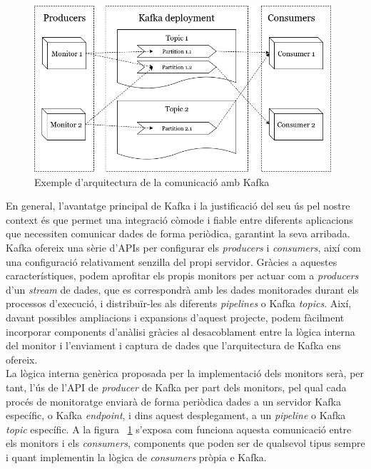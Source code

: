 \begin{figure}
\centering
\includegraphics[width=11cm]{Figures/Figure7}
\decoRule
\caption[Exemple d'arquitectura de la comunicació amb Kafka]{Exemple d'arquitectura de la comunicació amb Kafka}
\label{fig:Kafka}
\end{figure}

En general, l'avantatge principal de Kafka i la justificació del seu ús pel nostre context és que permet una integració còmode i fiable entre diferents aplicacions que necessiten comunicar dades de forma periòdica, garantint la seva arribada. Kafka ofereix una sèrie d'APIs per configurar els \textit{producers} i \textit{consumers}, així com una configuració relativament senzilla del propi servidor. Gràcies a aquestes característiques, podem aprofitar els propis monitors per actuar com a \textit{producers} d'un \textit{stream} de dades, que es correspondrà amb les dades monitorades durant els processos d'execució, i distribuïr-les als diferents \textit{pipelines} o Kafka \textit{topics}. Així, davant possibles ampliacions i expansions d'aquest projecte, podem fàcilment incorporar components d'anàlisi gràcies al desacoblament entre la lògica interna del monitor i l'enviament i captura de dades que l'arquitectura de Kafka ens ofereix.\\

La lògica interna genèrica proposada per la implementació dels monitors serà, per tant, l'ús de l'API de \textit{producer} de Kafka per part dels monitors, pel qual cada procés de monitoratge enviarà de forma periòdica dades a un servidor Kafka específic, o Kafka \textit{endpoint}, i dins aquest desplegament, a un \textit{pipeline} o Kafka \textit{topic} específic. A la figura ~\ref{fig:Kafka} s'exposa com funciona aquesta comunicació entre els monitors i els \textit{consumers}, components que poden ser de qualsevol tipus sempre i quant implementin la lògica de \textit{consumers} pròpia e Kafka.


